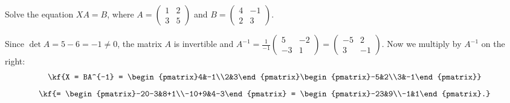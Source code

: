 \begin{misol}
Solve the equation $XA = B$, where
$A=\begin{pmatrix}1&2\\3&5\end{pmatrix}$ and $B=\begin{pmatrix}4&-1\\2&3\end{pmatrix}$.
\begin{yechish}
Since $\det A = 5-6=-1\neq 0$, the matrix $A$ is invertible and
$A^{-1}=\frac{1}{-1}\begin{pmatrix}5&-2\\-3&1\end{pmatrix}
=\begin{pmatrix}-5&2\\3&-1\end{pmatrix}$. Now we multiply by $A^{-1}$ on the
right:
\[\kf{X = BA^{-1} = \begin{pmatrix}4&-1\\2&3\end{pmatrix}\begin{pmatrix}-5&2\\3&-1\end{pmatrix}}\]
\[\kf{= \begin{pmatrix}-20-3&8+1\\-10+9&4-3\end{pmatrix}
= \begin{pmatrix}-23&9\\-1&1\end{pmatrix}.}\]
\end{yechish}
\end{misol}
